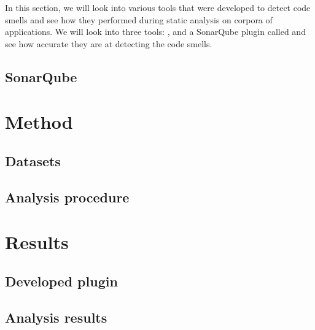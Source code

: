 \documentclass[12pt]{article}
\begin{document}
    In this section, we will look into various tools that were developed to detect code smells
    and see how they performed during static analysis on corpora of applications.
    We will look into three tools: ,  and a SonarQube plugin called
     and see how accurate they are at detecting the code smells.

    

    \subsection{SonarQube}\label{subsec:sonarqube}

    

    \newpage

    \section{Method}\label{sec:method}

    

    \subsection{Datasets}\label{subsec:datasets}

    

    \subsection{Analysis procedure}\label{subsec:analysis-procedure}

    

    \newpage

    \section{Results}\label{sec:results}

    \subsection{Developed plugin}\label{subsec:developed-plugin}

    

    \subsection{Analysis results}\label{subsec:analysis-results}
\end{document}
